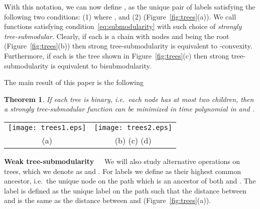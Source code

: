 \documentclass[11pt,onecolumn]{article}
\newtheorem{theorem}{Theorem}
\newcommand{\myparagraph}[1]{{\vspace*{2pt}\noindent\bf{#1}~~}}
\begin{document}
With this notation, we can now define , 
as the unique pair of labels satisfying the following two conditions:
(1) 
where , and (2)  (Figure~\ref{fig:trees}(a)).
We call functions  satisfying condition~\eqref{eq:submodularity} with such choice of  {\em strongly tree-submodular}.
Clearly, if each  is a chain with nodes  and  being the root (Figure~\ref{fig:trees}(b)) then strong tree-submodularity is equivalent
to -convexity. Furthermore, if each  is the tree shown in Figure~\ref{fig:trees}(c) then strong tree-submodularity is equivalent to bisubmodularity.

The main result of this paper is the following
\begin{theorem}
If each tree  is binary, i.e.\ each node has at most two children, then a strongly tree-submodular function 
can be minimized in time polynomial in  and .
\label{th:polynomiality}
\end{theorem}

\begin{figure*}[!t]
\begin{center}
\begin{tabular}{c@{\hspace{50pt}}c}
\texttt{[image: trees1.eps]} & \texttt{[image: trees2.eps]} \vspace{-10pt} \\ 
\hspace{30pt} (a) & (b) \hspace{50pt} (c) \hspace{50pt} (d) \hspace{28pt} \vspace{-10pt}
\end{tabular}
\end{center}
\caption{{\bf Examples of trees. Roots are always at the bottom.} (a) Illustration of the definition of , ,  and . 
(b) A tree for -convex functions. (c) A tree for bisubmodular functions. (d) A tree for which a weakly tree-submodular function can be minimized efficiently (see section~\ref{sec:weak}).
}
\label{fig:trees}
\end{figure*}

\myparagraph{Weak tree-submodularity} We will also study alternative operations on trees, which we denote as  and .
For labels  we define  as their highest common ancestor, i.e.\ the unique node on the path 
which is an ancestor of both  and . The label  is defined as the unique label on the path 
such that the distance between  and  is the same as the distance between  and  (Figure~\ref{fig:trees}(a)).
\end{document}
